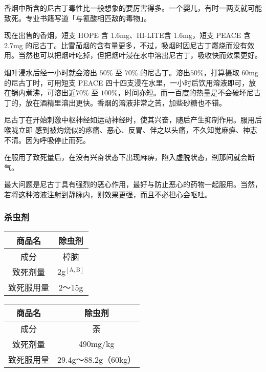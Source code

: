 \documentclass[UTF8]{ctexart}
\begin{document}
香烟中所含的尼古丁毒性比一般想象的要厉害得多。一个婴儿，有时一两支就可能致死。专业书籍写道「与氰酸相匹敌的毒物」。

现在出售的香烟，短支 HOPE 含 1.6mg、HI-LITE含 1.6mg，短支 PEACE 含 2.7mg 的尼古丁。比雪茄烟的含有量更多，不过，吸烟时因尼古丁燃烧而没有效用。当然也可以把烟叶吃掉，但把烟叶浸在水中溶出尼古丁，吸收快而效果更好。

烟叶浸水后经一小时就会溶出 $50\%$ 至 $70\%$ 的尼古丁。溶出$50\%$，打算摄取 60mg 的尼古丁时，可用短支 PEACE 四十四支浸在水里，一小时后饮用溶液即可，放在锅内煮沸，可溶出近$70\%$ 至 $100\%$，时间亦短。而一百度的热量是不会破坏尼古丁的，放在酒精里溶出更快。香烟的溶液非常之苦，加些砂糖也不错。

尼古丁在开始刺激中枢神经如运动神经时，使其兴奋，随后产生抑制作用。服用后喉咙立即 感到被灼烧似的疼痛、恶心、反胃、伴之以头痛，不久知觉麻痹、神志不清。因为呼吸停止而死。

在服用了致死量后，在没有兴奋状态下出现麻痹，陷入虚脱状态，剎那间就会断气。

最大问题是尼古丁具有强烈的恶心作用，最好与防止恶心的药物一起服用。当然，若将这种溶液注射到静脉内，则效果更强，而且不必担心会呕吐。

\subsubsection*{杀虫剂}

\begin{table}[htbp]
\begin{center}
\begin{tabular}{cc}

\toprule
商品名 & 除虫剂 \\
\midrule
成分 & 樟脑 \\
致死剂量 & 2g$^\mathrm{[A,B]}$ \\
致死服用量 & 2～15g \\
\bottomrule
\end{tabular}
\end{center}
\end{table}

\begin{table}[htbp]
\begin{center}
\begin{tabular}{cc}

\toprule
商品名 & 除虫剂 \\
\midrule
成分 & 荼 \\
致死剂量 & 490mg/kg \\
致死服用量 & 29.4g～88.2g（60kg） \\
\bottomrule
\end{tabular}
\end{center}
\end{table}
\end{document}

